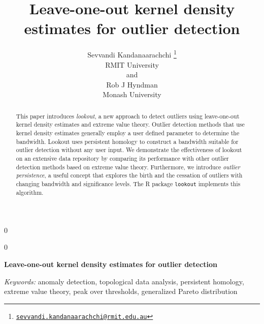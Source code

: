 \documentclass[12pt]{article}
\newcommand{\blind}{0}
\theoremstyle{definition}
\theoremstyle{definition}
\theoremstyle{definition}
\theoremstyle{definition}
\theoremstyle{remark}
\begin{document}
\def\spacingset#1{\renewcommand{\baselinestretch}%
{#1}\small\normalsize} \spacingset{1}



\blind
{
  \title{\bf Leave-one-out kernel density estimates for outlier detection}

  \author{
        Sevvandi Kandanaarachchi \thanks{\href{mailto:sevvandi.kandanaarachchi@rmit.edu.au}{\nolinkurl{sevvandi.kandanaarachchi@rmit.edu.au}}} \\
    RMIT University\\
     and \\     Rob J Hyndman \\
    Monash University\\
      }
  \maketitle
} \fi

\blind
{
  \bigskip
  \bigskip
  \bigskip
  \begin{center}
    {\LARGE\bf Leave-one-out kernel density estimates for outlier detection}
  \end{center}
  \medskip
} \fi

\bigskip
\begin{abstract}
This paper introduces \emph{lookout}, a new approach to detect outliers using leave-one-out kernel density estimates and extreme value theory. Outlier detection methods that use kernel density estimates generally employ a user defined parameter to determine the bandwidth. Lookout uses persistent homology to construct a bandwidth suitable for outlier detection without any user input. We demonstrate the effectiveness of lookout on an extensive data repository by comparing its performance with other outlier detection methods based on extreme value theory. Furthermore, we introduce \emph{outlier persistence}, a useful concept that explores the birth and the cessation of outliers with changing bandwidth and significance levels. The R package \texttt{lookout} implements this algorithm.
\end{abstract}

\noindent%
{\it Keywords:} anomaly detection, topological data analysis, persistent homology, extreme value theory, peak over thresholds, generalized Pareto distribution
\vfill

\newpage
\spacingset{1.45} %
\end{document}
